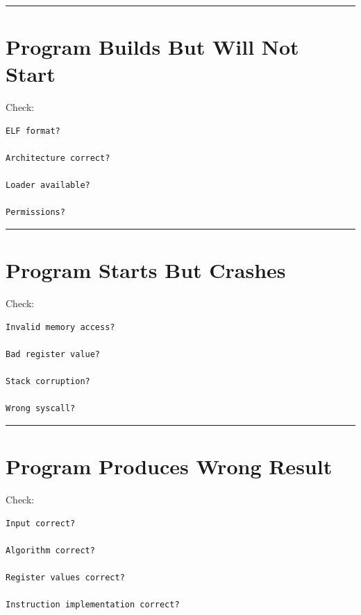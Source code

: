 \documentclass[
  oneside,
  openany]{book}
\begin{document}
\begin{center}\rule{0.5\linewidth}{0.5pt}\end{center}

\hypertarget{program-builds-but-will-not-start}{%
\section{Program Builds But Will Not
Start}\label{program-builds-but-will-not-start}}

Check:

\begin{verbatim}
ELF format?

Architecture correct?

Loader available?

Permissions?
\end{verbatim}

\begin{center}\rule{0.5\linewidth}{0.5pt}\end{center}

\hypertarget{program-starts-but-crashes}{%
\section{Program Starts But Crashes}\label{program-starts-but-crashes}}

Check:

\begin{verbatim}
Invalid memory access?

Bad register value?

Stack corruption?

Wrong syscall?
\end{verbatim}

\begin{center}\rule{0.5\linewidth}{0.5pt}\end{center}

\hypertarget{program-produces-wrong-result}{%
\section{Program Produces Wrong
Result}\label{program-produces-wrong-result}}

Check:

\begin{verbatim}
Input correct?

Algorithm correct?

Register values correct?

Instruction implementation correct?
\end{verbatim}
\end{document}
